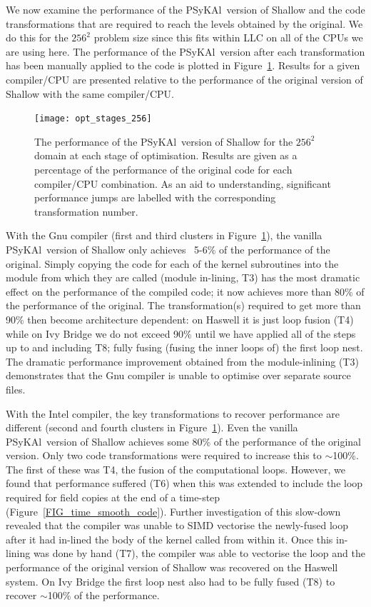 \documentclass{IOS-Book-Article}
\newcommand{\psykal}{{PS}y{KA}l}
\begin{document}
We now examine the performance of the \psykal\ version of Shallow and
the code transformations that are required to reach the levels
obtained by the original.  We do this for the $256^{2}$ problem size
since this fits within LLC on all of the CPUs we are using here.  The
performance of the \psykal\ version after each transformation has been
manually applied to the code is plotted in
Figure~\ref{FIG_opt_stages_256}. Results for a given compiler/CPU are
presented relative to the performance of the original version of Shallow
with the same compiler/CPU.

\begin{figure}[!t]
\centering
\texttt{[image: opt\_stages\_256]}
\caption{The performance of the \psykal\ version of Shallow for the
  $256^{2}$ domain at each stage of optimisation. Results are given as
  a percentage of the performance of the original code for each
  compiler/CPU combination. As an aid to understanding, significant
  performance jumps are labelled with the corresponding transformation
  number.}
\label{FIG_opt_stages_256}
\end{figure}

With the Gnu compiler (first and third clusters in
Figure~\ref{FIG_opt_stages_256}), the vanilla \psykal\ version of
Shallow only achieves ~5-6\% of the performance of the
original. Simply copying the code for each of the kernel subroutines
into the module from which they are called (module in-lining, T3) has the
most dramatic effect on the performance of the compiled code; it now
achieves more than 80\% of the performance of the original. The
transformation(s) required to get more than 90\% then become
architecture dependent: on Haswell it is just loop fusion (T4) while on Ivy
Bridge we do not exceed 90\% until we have applied all of the steps up to
and including T8; fully fusing (fusing the inner loops of)
the first loop nest. The dramatic performance improvement obtained
from the module-inlining (T3) demonstrates that the Gnu
compiler is unable to optimise over separate source files.

With the Intel compiler, the key transformations to recover
performance are different (second and fourth clusters in
Figure~\ref{FIG_opt_stages_256}).  Even the vanilla \psykal\ version of
Shallow achieves some 80\% of the performance of the original
version. Only two code transformations were required to increase this
to $\sim$100\%. The first of these was T4, the fusion of the computational
loops. However, we found that performance suffered (T6) when this
was extended to include the loop required for field copies at the end
of a time-step (Figure~\ref{FIG_time_smooth_code}). Further
investigation of this slow-down revealed that the compiler was unable
to SIMD vectorise the newly-fused loop after it had in-lined the body
of the kernel called from within it. Once this in-lining was done by
hand (T7), the compiler was able to vectorise the loop and the
performance of the original version of Shallow was recovered on the
Haswell system. On Ivy Bridge the first loop nest also had to be fully
fused (T8) to recover $\sim$100\% of the performance.
\end{document}
